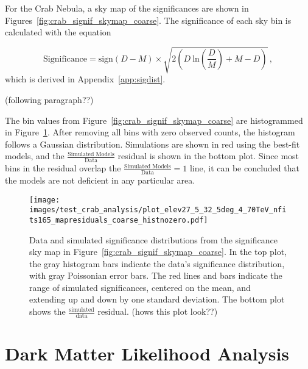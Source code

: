 For the Crab Nebula, a sky map of the significances are shown in Figures~\ref{fig:crab_signif_skymap_coarse}.
The significance of each sky bin is calculated with the equation

\begin{equation}\label{eqn:resmap_signif}
  \textrm{Significance} = \textrm{sign}(D-M) \times \sqrt{ 2 \left ( D \: \textrm{ln} \left ( \frac{D}{M} \right ) + M - D \right ) } \,,
\end{equation}
which is derived in Appendix~\ref{app:sigdist}.

{\color{red}(following paragraph??)}

The bin values from Figure~\ref{fig:crab_signif_skymap_coarse} are histogrammed in Figure~\ref{fig:crab_signif_distribution}.
After removing all bins with zero observed counts, the histogram follows a Gaussian distribution.
Simulations are shown in red using the best-fit models, and the $\frac{\textrm{Simulated Models}}{\textrm{Data}}$ residual is shown in the bottom plot.
Since most bins in the residual overlap the ${\frac{\textrm{Simulated Models}}{\textrm{Data}} = 1}$ line, it can be concluded that the models are not deficient in any particular area.

\begin{figure}[tb]
  \centering
  \texttt{[image: images/test\_crab\_analysis/plot\_elev27\_5\_32\_5deg\_4\_70TeV\_nfits165\_mapresiduals\_coarse\_histnozero.pdf]}
  \caption[Crab Residual Bin Distribution]{
    Data and simulated significance distributions from the significance sky map in Figure~\ref{fig:crab_signif_skymap_coarse}.
    In the top plot, the gray histogram bars indicate the data's significance distribution, with gray Poissonian error bars.
    The red lines and bars indicate the range of simulated significances, centered on the mean, and extending up and down by one standard deviation.
    The bottom plot shows the $\frac{\textrm{simulated}}{\textrm{data}}$ residual.
    {\color{red}(hows this plot look??)}
  }
  \label{fig:crab_signif_distribution}
\end{figure}
  
\FloatBarrier

\section{Dark Matter Likelihood Analysis}\label{sec:dmlike}
  
